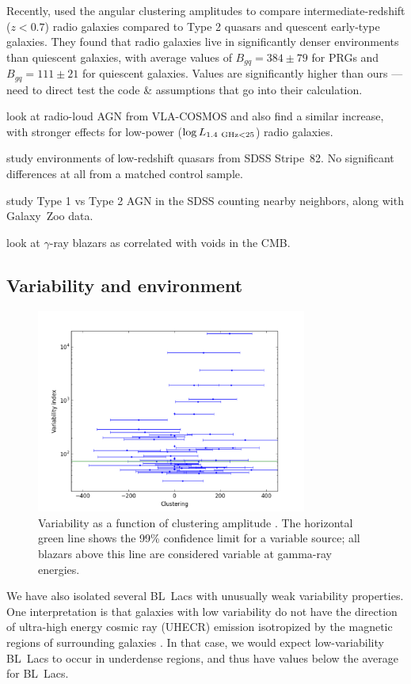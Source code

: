 \documentclass{emulateapj}
\begin{document}
Recently, \citet{ram13} used the angular clustering amplitudes to compare intermediate-redshift ($z<0.7$) radio galaxies compared to Type 2 quasars and quescent early-type galaxies. They found that radio galaxies live in significantly denser environments than quiescent galaxies, with average values of $B_{gq}=384\pm79$ for PRGs and $B_{gq}=111\pm21$ for quiescent galaxies. Values are significantly higher than ours --- need to direct test the code \& assumptions that go into their calculation. 

\cite{mal15} look at radio-loud AGN from VLA-COSMOS and also find a similar increase, with stronger effects for low-power ($\log L_{1.4~{\rm GHz} < 25}$) radio galaxies. 

\citet{kar14a} study environments of low-redshift quasars from SDSS Stripe~82. No significant differences at all from a matched control sample.

\citet{vil14a} study Type 1 vs Type 2 AGN in the SDSS counting nearby neighbors, along with Galaxy~Zoo data. 

\citet{fur15} look at $\gamma$-ray blazars as correlated with voids in the CMB. 

\subsection{Variability and environment}

\begin{figure}
\includegraphics[width=3.5in]{figures/variability.pdf}
\caption{Variability \tsvar{} as a function of clustering amplitude \bgb{}. The horizontal green line shows the 99\% confidence limit for a variable source; all blazars above this line are considered variable at gamma-ray energies. 
\label{fig:variability}}
\end{figure}

We have also isolated several BL~Lacs with unusually weak variability properties. One interpretation is that galaxies with low variability do not have the direction of ultra-high energy cosmic ray (UHECR) emission isotropized by the magnetic regions of surrounding galaxies \citep{raz12}. In that case, we would expect low-variability BL~Lacs to occur in underdense regions, and thus have \bgb{} values below the average for BL~Lacs.  
\end{document}
